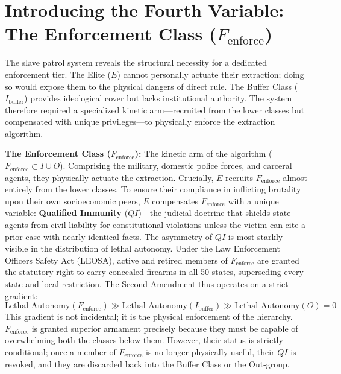 \documentclass[12pt,openany]{book}
\begin{document}
\section{Introducing the Fourth Variable: The Enforcement Class ($F_{\text{enforce}}$)}

The slave patrol system reveals the structural necessity for a dedicated enforcement tier. The Elite ($E$) cannot personally actuate their extraction; doing so would expose them to the physical dangers of direct rule. The Buffer Class ($I_{\text{buffer}}$) provides ideological cover but lacks institutional authority. The system therefore required a specialized kinetic arm---recruited from the lower classes but compensated with unique privileges---to physically enforce the extraction algorithm.

\begin{definition}
\textbf{The Enforcement Class ($F_{\text{enforce}}$):} The kinetic arm of the algorithm ($F_{\text{enforce}} \subset I \cup O$). Comprising the military, domestic police forces, and carceral agents, they physically actuate the extraction. Crucially, $E$ recruits $F_{\text{enforce}}$ almost entirely from the lower classes. To ensure their compliance in inflicting brutality upon their own socioeconomic peers, $E$ compensates $F_{\text{enforce}}$ with a unique variable: \textbf{Qualified Immunity} ($QI$)---the judicial doctrine that shields state agents from civil liability for constitutional violations unless the victim can cite a prior case with nearly identical facts. The asymmetry of $QI$ is most starkly visible in the distribution of lethal autonomy. Under the Law Enforcement Officers Safety Act (LEOSA), active and retired members of $F_{\text{enforce}}$ are granted the statutory right to carry concealed firearms in all 50 states, superseding every state and local restriction. The Second Amendment thus operates on a strict gradient:
    \[
    \text{Lethal Autonomy}(F_{\text{enforce}}) \gg \text{Lethal Autonomy}(I_{\text{buffer}}) \gg \text{Lethal Autonomy}(O) = 0
    \]
    This gradient is not incidental; it is the physical enforcement of the hierarchy. $F_{\text{enforce}}$ is granted superior armament precisely because they must be capable of overwhelming both the classes below them. However, their status is strictly conditional; once a member of $F_{\text{enforce}}$ is no longer physically useful, their $QI$ is revoked, and they are discarded back into the Buffer Class or the Out-group.
\end{definition}
\end{document}
